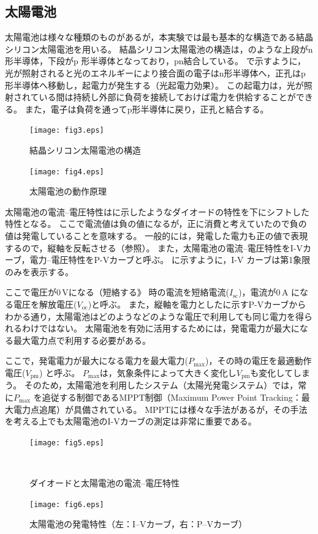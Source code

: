 \documentclass[11pt,dvipdfmx]{jarticle}
\begin{document}
\subsection{太陽電池}
太陽電池は様々な種類のものがあるが，本実験では最も基本的な構造である結晶シリコン太陽電池を用いる。
結晶シリコン太陽電池の構造は，のような上段がn 形半導体，下段がp 形半導体となっており，pn結合している。
で示すように，光が照射されると光のエネルギーにより接合面の電子はn形半導体へ，正孔はp形半導体へ移動し，起電力が発生する（光起電力効果）。
この起電力は，光が照射されている間は持続し外部に負荷を接続しておけば電力を供給することができる。
また，電子は負荷を通ってp形半導体に戻り，正孔と結合する。
\begin{figure}[htb]
	\centering
	\texttt{[image: fig3.eps]}
	\caption{結晶シリコン太陽電池の構造}
	\label{fig:fig3}
\end{figure}

\begin{figure}[htb]
	\centering
	\texttt{[image: fig4.eps]}
	\caption{太陽電池の動作原理}
	\label{fig:fig4}
\end{figure}

太陽電池の電流--電圧特性はに示したようなダイオードの特性を下にシフトした特性となる。
ここで電流値は負の値になるが，正に消費と考えていたので負の値は発電していることを意味する。
一般的には，発電した電力も正の値で表現するので，縦軸を反転させる（参照）。
また，太陽電池の電流--電圧特性をI-Vカーブ，電力--電圧特性をP-Vカーブと呼ぶ。
に示すように，I-V カーブは第1象限のみを表示する。


ここで電圧が0\,Vになる（短絡する》 時の電流を短絡電流($I_{\mathrm{sc}}$)，電流が0\,A になる電圧を解放電圧($V_{\mathrm{oc}}$)と呼ぶ。
また，縦軸を電力としたに示すP-Vカーブからわかる通り，太陽電池はどのようなどのような電圧で利用しても同じ電力を得られるわけではない。
太陽電池を有効に活用するためには，発電電力が最大になる最大電力点で利用する必要がある。

ここで，発電電力が最大になる電力を最大電力($P_{\mathrm{max}}$)，その時の電圧を最適動作電圧($V_{\mathrm{pm}}$) と呼ぶ。
$P_{\mathrm{max}}$は，気象条件によって大きく変化し$V_{\mathrm{pm}}$も変化してしまう。
そのため，太陽電池を利用したシステム（太陽光発電システム）では，常に$P_{\mathrm{max}}$ を追従する制御であるMPPT制御（Maximum Power Point Tracking：最大電力点追尾）が具備されている。
MPPTには様々な手法があるが，その手法を考える上でも太陽電池のI-Vカーブの測定は非常に重要である。

\begin{figure}[htb]
	\centering
	\texttt{[image: fig5.eps]}
	\caption{ダイオードと太陽電池の電流--電圧特性}\
	\label{fig:fig5}
\end{figure}
\begin{figure}[htb]
	\centering
	\texttt{[image: fig6.eps]}
	\caption{太陽電池の発電特性（左：I--Vカーブ，右：P--Vカーブ）}
	\label{fig:fig6}
\end{figure}%
\clearpage
\end{document}
